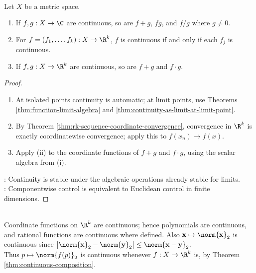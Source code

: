 \begin{theorem} \label{thm:continuous-algebra-and-components} \\
Let $X$ be a metric space.
\begin{enumerate}[label=(\roman*)]
\setlength{\itemsep}{0pt}
\item If $f,g:X\to\C$ are continuous, so are $f+g$, $fg$, and $f/g$ where $g\neq0$.
\item For $f=(f_1,\ldots,f_k):X\to\R^k$, $f$ is continuous if and only if each $f_j$ is continuous.
\item If $f,g:X\to\R^k$ are continuous, so are $f+g$ and $f\cdot g$.
\end{enumerate}
\begin{proof}
\begin{enumerate}[label=(\roman*)]
\setlength{\itemsep}{0pt}
\item At isolated points continuity is automatic; at limit points, use Theorems \ref{thm:function-limit-algebra} and \ref{thm:continuity-as-limit-at-limit-point}.
\item By Theorem \ref{thm:rk-sequence-coordinate-convergence}, convergence in $\R^k$ is exactly coordinatewise convergence; apply this to $f(x_n)\to f(x)$.
\item Apply (ii) to the coordinate functions of $f+g$ and $f\cdot g$, using the scalar algebra from (i).
\end{enumerate}
: Continuity is stable under the algebraic operations already stable for limits.\\
: Componentwise control is equivalent to Euclidean control in finite dimensions.
\end{proof}
\end{theorem}

\begin{example} \label{ex:coordinate-polynomial-rational-norm-continuity} \\
Coordinate functions on $\R^k$ are continuous; hence polynomials are continuous, and rational functions are continuous where defined. Also $\mathbf{x}\mapsto\norm{\mathbf{x}}_2$ is continuous since $\bigl|\norm{\mathbf{x}}_2-\norm{\mathbf{y}}_2\bigr|\leq\norm{\mathbf{x}-\mathbf{y}}_2$.\\
Thus $p\mapsto\norm{f(p)}_2$ is continuous whenever $f:X\to\R^k$ is, by Theorem \ref{thm:continuous-composition}.
\end{example}

